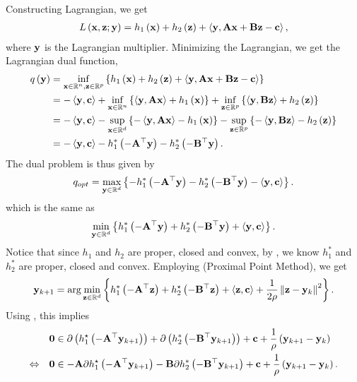 \documentclass{article}
\begin{document}
Constructing Lagrangian, we get 
\begin{align*}
    L\left(\mathbf{x}, \mathbf{z}; \mathbf{y}\right) = h_1\left(\mathbf{x}\right) + h_2\left(\mathbf{z}\right) + \left\langle \mathbf{y}, \mathbf{A} \mathbf{x} + \mathbf{B} \mathbf{z} - \mathbf{c} \right\rangle,
\end{align*}
where $\mathbf{y}$ is the Lagrangian multiplier.
Minimizing the Lagrangian, we get the Lagrangian dual function, 
\begin{align*}
    q\left(\mathbf{y}\right) &= \inf_{\mathbf{x} \in \mathbb{R}^n, \mathbf{z} \in \mathbb{R}^p} \left\{h_1\left(\mathbf{x}\right) + h_2\left(\mathbf{z}\right) + \left\langle \mathbf{y}, \mathbf{A}\mathbf{x} + \mathbf{B}\mathbf{z} - \mathbf{c} \right\rangle\right\} \\
    &= -\left\langle \mathbf{y}, \mathbf{c} \right\rangle + \inf_{\mathbf{x} \in \mathbb{R}^n}\left\{\left\langle \mathbf{y}, \mathbf{A} \mathbf{x} \right\rangle + h_1\left(\mathbf{x}\right)\right\} + \inf_{\mathbf{z} \in \mathbb{R}^p}\left\{\left\langle \mathbf{y}, \mathbf{B}\mathbf{z} \right\rangle + h_2\left(\mathbf{z}\right)\right\} \\
    &= -\left\langle \mathbf{y}, \mathbf{c} \right\rangle - \sup_{\mathbf{x} \in \mathbb{R}^d}\left\{- \left\langle \mathbf{y}, \mathbf{A} \mathbf{x} \right\rangle - h_1\left(\mathbf{x}\right)\right\} - \sup_{\mathbf{z} \in \mathbb{R}^p}\left\{-\left\langle \mathbf{y}, \mathbf{B} \mathbf{z} \right\rangle - h_2\left(\mathbf{z}\right)\right\} \\
    &= -\left\langle \mathbf{y}, \mathbf{c} \right\rangle - h_1^*\left(-\mathbf{A}^\top \mathbf{y}\right) - h_2^*\left(-\mathbf{B}^\top \mathbf{y}\right).
\end{align*}
The dual problem is thus given by 
\begin{align*}
    q_{opt} = \max_{\mathbf{y} \in \mathbb{R}^d} \left\{- h_1^*\left(-\mathbf{A}^\top \mathbf{y}\right) - h_2^*\left(-\mathbf{B}^\top \mathbf{y}\right) - \left\langle \mathbf{y}, \mathbf{c} \right\rangle\right\}.
\end{align*}
which is the same as 
\begin{align*}
    \min_{\mathbf{y} \in \mathbb{R}^d} \left\{h_1^*\left(-\mathbf{A}^\top \mathbf{y}\right) + h_2^*\left(-\mathbf{B}^\top \mathbf{y}\right) + \left\langle \mathbf{y}, \mathbf{c} \right\rangle\right\}.
\end{align*}
Notice that since $h_1$ and $h_2$ are proper, closed and convex, by \cite[Theorem 4.3 and 4.5]{beck2017first}, we know $h_1^*$ and $h_2^*$ are proper, closed and convex.
Employing (Proximal Point Method), we get 
\begin{align*}
    \mathbf{y}_{k+1} = \arg\min_{\mathbf{z} \in \mathbb{R}^d}\left\{h_1^*\left(-\mathbf{A}^\top\mathbf{z}\right) + h_2^\star\left(-\mathbf{B}^\top \mathbf{z}\right) + \left\langle \mathbf{z}, \mathbf{c} \right\rangle + \frac{1}{2\rho}\left\| \mathbf{z} - \mathbf{y}_k \right\|^2\right\}.
\end{align*}
Using \cite[Theorem 3.40]{beck2017first}, this implies 
\begin{align}
    \label{eq:conv:cond:1}
    & \mzero \in \partial\rbrac{ h_1^\star\rbrac{-\mA^\top \my_{k+1}} } + \partial \rbrac{h_2^*\rbrac{-\mB^\top \my_{k+1}}} + \mc + \frac{1}{\rho}\rbrac{\my_{k+1} - \my_k} \notag \\
    \Leftrightarrow \quad & \mzero \in -\mA \partial h_1^\star\rbrac{-\mA^\top \my_{k+1}} - \mB \partial h_2^*\rbrac{-\mB^\top \my_{k+1}} + \mc + \frac{1}{\rho}\rbrac{\my_{k+1} - \my_k}.
\end{align}
\end{document}
